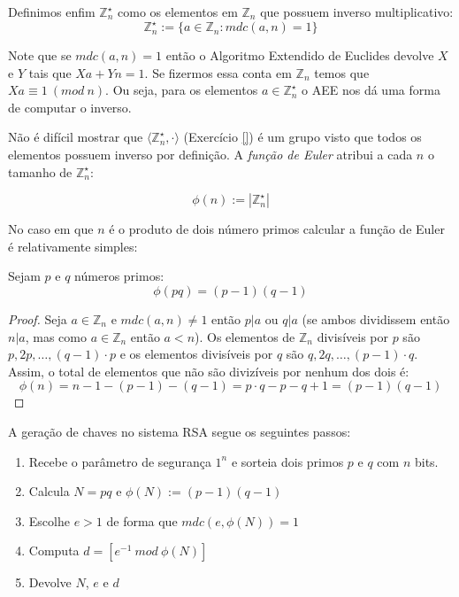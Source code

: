 Definimos enfim $\mathbb{Z}_n^\star$ como os elementos em $\mathbb{Z}_n$ que possuem inverso multiplicativo:
\begin{displaymath}
  \mathbb{Z}_n^\star := \{a \in \mathbb{Z}_n : mdc(a,n) = 1\}
\end{displaymath}

Note que se $mdc(a,n) = 1$ então o Algoritmo Extendido de Euclides devolve $X$ e $Y$ tais que $Xa + Yn = 1$.
Se fizermos essa conta em $\mathbb{Z}_n$ temos que $Xa \equiv 1\ (mod\ n)$.
Ou seja, para os elementos $a \in \mathbb{Z}_n^\star$ o AEE nos dá uma forma de computar o inverso.
 
Não é difícil mostrar que $\langle \mathbb{Z}_n^\star, \cdot \rangle$ (Exercício \ref{}) é um grupo visto que todos os elementos possuem inverso por definição.
A {\em função de Euler} atribui a cada $n$ o tamanho de $\mathbb{Z}_n^\star$:

\begin{displaymath}
  \phi(n) := |\mathbb{Z}_n^\star|
\end{displaymath}

No caso em que $n$ é o produto de dois número primos calcular a função de Euler é relativamente simples:

\begin{proposition}
Sejam $p$ e $q$ números primos:  
\begin{displaymath}
  \phi(pq) = (p - 1)(q - 1)
\end{displaymath}
\end{proposition}
\begin{proof}
Seja $a \in \mathbb{Z}_n$ e $mdc(a, n) \neq 1$ então $p|a$ ou $q|a$ (se ambos dividissem então $n|a$, mas como $a \in \mathbb{Z}_n$ então $a < n$).
Os elementos de $\mathbb{Z}_n$ divisíveis por $p$ são $p, 2p, \dots , (q - 1) \cdot p$ e os elementos divisíveis por $q$ são $q, 2q, \dots , (p - 1) \cdot q$. 
Assim, o total de elementos que não são divizíveis por nenhum dos dois é:
\begin{displaymath}
  \phi(n) = n - 1 - (p - 1) - (q - 1) = p \cdot q - p - q + 1 = (p - 1)(q - 1)
\end{displaymath}


\end{proof}

A geração de chaves no sistema RSA segue os seguintes passos:
\begin{enumerate}
\item Recebe o parâmetro de segurança $1^n$ e sorteia dois primos $p$ e $q$ com $n$ bits.
\item Calcula $N = pq$ e $\phi(N) := (p - 1)(q - 1)$
\item Escolhe $e > 1$ de forma que $mdc(e, \phi(N)) = 1$
\item Computa $d = [e^{-1}\ mod\ \phi(N)]$
\item Devolve $N$, $e$ e $d$ 
\end{enumerate}

